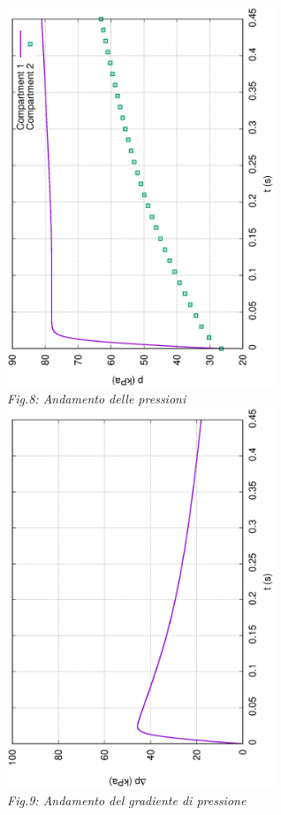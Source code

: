 \documentclass{article}
\begin{document}
        \begin{center}
            \includegraphics[width=0.6\textwidth, angle=-90]{MUL2/p_ES1_0.5.eps}\\ 
            \textit{Fig.8: Andamento delle pressioni} \\ 
            \label{fig:press_effl_0.5}
            \includegraphics[width=0.6\textwidth, angle=-90]{MUL2/Dp_ES1_0.5.eps}\\
            \textit{Fig.9: Andamento del gradiente di pressione}\\
        \end{center}
        \pagebreak
\end{document}
